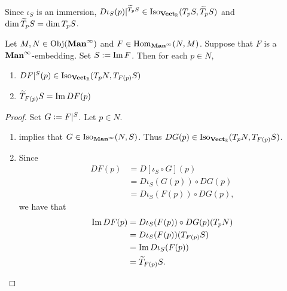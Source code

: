 \documentclass{book}
\begin{document}
	\begin{note}
		Since $\iota_S$ is an immersion, $D\iota_S(p)|^{\widetilde{T}_pS} \in \operatorname{Iso}_{\operatorname*{\text{\textbf{Vect}}_{\mathbb{R}}}}(T_pS, \widetilde{T}_pS)$ and $\dim \widetilde{T}_p S = \dim T_pS$.
	\end{note}

	\begin{ex} 
		Let $M, N \in \operatorname{Obj}(\operatorname*{\text{\textbf{Man}}^{\infty}})$ and $F \in \operatorname{Hom}_{\operatorname*{\text{\textbf{Man}}^{\infty}}}(N, M)$. Suppose that $F$ is a $\operatorname*{\text{\textbf{Man}}^{\infty}}$-embedding. Set $S \vcentcolon= \text{Im} \, F$. Then for each $p \in N$,
		\begin{enumerate}
			\item $DF|^S(p) \in \operatorname{Iso}_{\operatorname*{\text{\textbf{Vect}}_{\mathbb{R}}}}(T_pN, T_{F(p)}S)$
			\item $\widetilde{T}_{F(p)}S = \text{Im} \, DF(p)$
		\end{enumerate}
	\end{ex}

	\begin{proof}
		Set $G \vcentcolon= F|^S$. Let $p \in N$.
		\begin{enumerate}
			\item {} implies that $G \in \operatorname{Iso}_{\operatorname*{\text{\textbf{Man}}^{\infty}}}(N, S)$. Thus $DG(p) \in \operatorname{Iso}_{\operatorname*{\text{\textbf{Vect}}_{\mathbb{R}}}}(T_pN, T_{F(p)}S)$.
			\item Since 
			\begin{align*}
				DF(p)
				& = D[\iota_S \circ G](p) \\
				& = D \iota_S(G(p)) \circ DG(p) \\
				& = D \iota_S(F(p)) \circ DG(p),
			\end{align*}
			we have that 
			\begin{align*}
				\text{Im} \, DF(p)
				& = D \iota_S(F(p)) \circ DG(p)(T_pN) \\
				& = D \iota_S(F(p))(T_{F(p)}S) \\
				& = \text{Im} \, D \iota_S(F(p)) \\
				& = \widetilde{T}_{F(p)}S.
			\end{align*}
		\end{enumerate}
	\end{proof}
	
	
\end{document}
